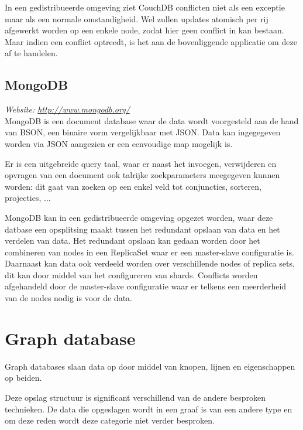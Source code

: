 In een gedistribueerde omgeving ziet CouchDB conflicten niet als een exceptie maar als een normale omstandigheid. Wel zullen updates atomisch per rij afgewerkt worden op een enkele node, zodat hier geen conflict in kan bestaan. Maar indien een conflict optreedt, is het aan de bovenliggende applicatie om deze af te handelen. 


\subsection{MongoDB}
\textit{Website: \url{http://www.mongodb.org/}}\\
MongoDB is een document database waar de data wordt voorgesteld aan de hand van BSON, een binaire vorm vergelijkbaar met JSON. Data kan ingegegeven worden via JSON aangezien er een eenvoudige map mogelijk is. 

Er is een uitgebreide query taal, waar er naast het invoegen, verwijderen en opvragen van een document ook talrijke zoekparameters meegegeven kunnen worden: dit gaat van zoeken op een enkel veld tot conjuncties, sorteren, projecties, ... 

MongoDB kan in een gedistribueerde omgeving opgezet worden, waar deze datbase een opsplitsing maakt tussen het redundant opslaan van data en het verdelen van data. Het redundant opslaan kan gedaan worden door het combineren van nodes in een ReplicaSet waar er een master-slave configuratie is. Daarnaast kan data ook verdeeld worden over verschillende nodes of replica sets, dit kan door middel van het configureren van shards. 
Conflicts worden afgehandeld door de master-slave configuratie waar er telkens een meerderheid van de nodes nodig is voor de data. 

\section{Graph database}
Graph databases slaan data op door middel van knopen, lijnen en eigenschappen op beiden. 

Deze opslag structuur is significant verschillend van de andere besproken technieken. De data die opgeslagen wordt in een graaf is van een andere type en om deze reden wordt deze categorie niet verder besproken. 
 
